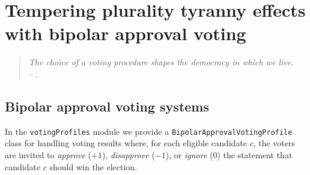 \chapter[Bipolar approval voting]{ Tempering plurality tyranny effects with bipolar approval voting}
\label{sec:21}

\abstract*{}

\abstract{}

\begin{quotation}\emph{The choice of a voting procedure shapes the democracy in which we live}.\\
    -- \citet*{BAU-2012}.
\end{quotation}

\section{Bipolar approval voting systems}
\label{sec:21.1}

In the \texttt{votingProfiles} module we provide a \texttt{BipolarApprovalVotingProfile} class for handling voting results where, for each eligible candidate $c$, the voters are invited  to \emph{approve} ($+1$), \emph{disapprove} ($-1$), or \emph{ignore} ($0$) the statement that candidate $c$ should win the election.

